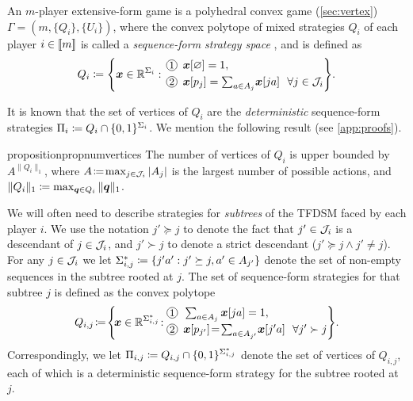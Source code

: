 An $m$-player extensive-form game is a polyhedral convex game (\cref{sec:vertex}) $\Gamma = (m, \{Q_i\}, \{U_i\})$, where the convex polytope of mixed strategies $Q_i$ of each player $i\in[\![m]\!]$ is called a \emph{sequence-form strategy space} \citep{Romanovskii62:Reduction,Stengel96:Efficient,Koller96:Efficient}, and is defined as
\newcommand*\circled[1]{%
    \tikz[baseline=(C.base)]\node[draw,circle,inner sep=0.8pt](C) {\small #1};\!%
}
\[
    Q_i \defeq \mleft\{\vx \in \bbR^{\Sigma_i}: \!\!\begin{array}{l} \circled{1}~~ \vx[\emptyseq] = 1, \\[1mm] \circled{2}~~ \vx[p_j] = \sum_{a\in A_j} \!\vx[ja] ~~\forall j\in\cJ_i \end{array}\!\!\!\mright\}.
\]

It is known that the set of vertices of $Q_i$ are the \emph{deterministic} sequence-form strategies $\Pi_i \coloneqq Q_i \cap \{0,1\}^{\Sigma_i}$.
We mention the following result (see \cref{app:proofs}).
\begin{restatable}{proposition}{propnumvertices}\label{prop:efg vertex count}
    The number of vertices of $Q_i$ is upper bounded by $A^{\|Q_i\|_1}$, where $A \!\coloneqq\! \max_{j\in{\mathcal{J}}_i} |A_j|$ is the largest number of possible actions, and $\|Q_i\|_1 \coloneqq \max_{\bm{q}\in Q_i}\|\bm{q}\|_1$.
\end{restatable}

We will often need to describe strategies for \emph{subtrees} of the TFDSM faced by each player $i$. We use the notation $j' \succeq j$ to denote the fact that $j'\in{\mathcal{J}}_i$ is a descendant of $j\in{\mathcal{J}}_i$, and $j'\succ j$ to denote a strict descendant (\ie $j'\succeq j \land j'\neq j$). For any $j\in{\mathcal{J}}_i$ we let $\Sigma^*_{i,j} \coloneqq \{j'a': j' \succeq j, a' \in A_{j'}\}$ denote the set of non-empty sequences in the subtree rooted at $j$. The set of sequence-form strategies for that subtree $j$ is defined as the convex polytope
\[
    Q_{i,j} \!\defeq\! \mleft\{\!\vx \in \bbR^{\Sigma^*_{i,j}}\!: \!\!\!\begin{array}{l} \circled{1}~~ \sum_{a\in A_j}\vx[ja] = 1, \\[1mm] \circled{2}~~ \vx[p_{j'}] \!=\! \sum_{a\in A_{j'}} \!\vx[j'a] ~~\forall j'\succ j\end{array}\!\!\!\mright\}.
\]
Correspondingly, we let $\Pi_{i,j} \coloneqq Q_{i,j} \cap \{0,1\}^{\Sigma^*_{i,j}}$ denote the set of vertices of $Q_{i,j}$, each of which is a deterministic sequence-form strategy for the subtree rooted at $j$.



